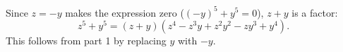 Since $z=-y$ makes the expression zero ($(-y)^5+y^5=0$), $z+y$ is a factor:
\[
z^5+y^5=\boxed{(z+y)\left(z^4-z^3y+z^2y^2-zy^3+y^4\right)}.
\]
This follows from part 1 by replacing $y$ with $-y$.
